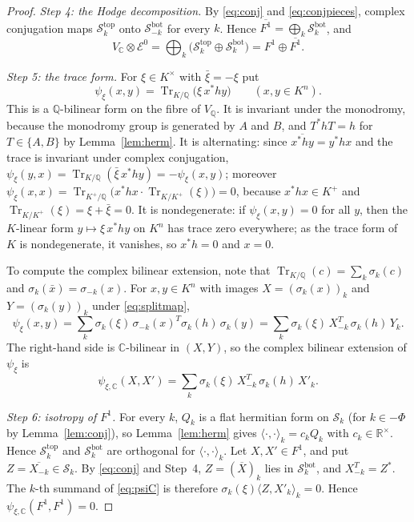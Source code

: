 \documentclass[11pt]{amsart}
\theoremstyle{definition}
\theoremstyle{remark}
\numberwithin{equation}{section}
\newcommand{\Q}{\mathbb{Q}}
\newcommand{\C}{\mathbb{C}}
\newcommand{\R}{\mathbb{R}}
\newcommand{\cS}{\mathcal{S}}
\newcommand{\cE}{\mathcal{E}}
\newcommand{\tp}{\mathrm{top}}
\newcommand{\bt}{\mathrm{bot}}
\DeclareMathOperator{\Tr}{Tr}
\begin{document}
\begin{proof}
\emph{Step 4: the Hodge decomposition.} By \eqref{eq:conj} and \eqref{eq:conjpieces}, complex conjugation maps $\cS_k^{\tp}$ onto $\cS_{-k}^{\bt}$ for every $k$. Hence $\overline{F^1}=\bigoplus_k\cS_k^{\bt}$, and
\[
V_\C\otimes\cE^0=\bigoplus_k\big(\cS_k^{\tp}\oplus\cS_k^{\bt}\big)=F^1\oplus\overline{F^1}.
\]

\emph{Step 5: the trace form.} For $\xi\in K^\times$ with $\bar\xi=-\xi$ put
\[
\psi_\xi(x,y)=\Tr_{K/\Q}\big(\xi\,x^*hy\big)\qquad(x,y\in K^n).
\]
This is a $\Q$-bilinear form on the fibre of $V_\Q$. It is invariant under the monodromy, because the monodromy group is generated by $A$ and $B$, and $T^*hT=h$ for $T\in\{A,B\}$ by Lemma~\ref{lem:herm}. It is alternating: since $\overline{x^*hy}=y^*hx$ and the trace is invariant under complex conjugation, $\psi_\xi(y,x)=\Tr_{K/\Q}(\bar\xi\,x^*hy)=-\psi_\xi(x,y)$; moreover $\psi_\xi(x,x)=\Tr_{K^+/\Q}\big(x^*hx\cdot\Tr_{K/K^+}(\xi)\big)=0$, because $x^*hx\in K^+$ and $\Tr_{K/K^+}(\xi)=\xi+\bar\xi=0$. It is nondegenerate: if $\psi_\xi(x,y)=0$ for all $y$, then the $K$-linear form $y\mapsto\xi\,x^*hy$ on $K^n$ has trace zero everywhere; as the trace form of $K$ is nondegenerate, it vanishes, so $x^*h=0$ and $x=0$.

To compute the complex bilinear extension, note that $\Tr_{K/\Q}(c)=\sum_k\sigma_k(c)$ and $\sigma_k(\bar x)=\sigma_{-k}(x)$. For $x,y\in K^n$ with images $X=(\sigma_k(x))_k$ and $Y=(\sigma_k(y))_k$ under \eqref{eq:splitmap},
\[
\psi_\xi(x,y)=\sum_k\sigma_k(\xi)\,\sigma_{-k}(x)^T\sigma_k(h)\,\sigma_k(y)=\sum_k\sigma_k(\xi)\,X_{-k}^T\,\sigma_k(h)\,Y_k .
\]
The right-hand side is $\C$-bilinear in $(X,Y)$, so the complex bilinear extension of $\psi_\xi$ is
\begin{equation}\label{eq:psiC}
\psi_{\xi,\C}(X,X')=\sum_k\sigma_k(\xi)\,X_{-k}^{T}\,\sigma_k(h)\,X'_k .
\end{equation}

\emph{Step 6: isotropy of $F^1$.} For every $k$, $Q_k$ is a flat hermitian form on $\cS_k$ (for $k\in-\Phi$ by Lemma~\ref{lem:conj}), so Lemma~\ref{lem:herm} gives $\langle\cdot,\cdot\rangle_k=c_kQ_k$ with $c_k\in\R^\times$. Hence $\cS_k^{\tp}$ and $\cS_k^{\bt}$ are orthogonal for $\langle\cdot,\cdot\rangle_k$. Let $X,X'\in F^1$, and put $Z=\overline{X_{-k}}\in\cS_k$. By \eqref{eq:conj} and Step~4, $Z=(\overline X)_k$ lies in $\cS_k^{\bt}$, and $X_{-k}^T=Z^*$. The $k$-th summand of \eqref{eq:psiC} is therefore $\sigma_k(\xi)\langle Z,X'_k\rangle_k=0$. Hence $\psi_{\xi,\C}(F^1,F^1)=0$.


\end{proof}
\end{document}
